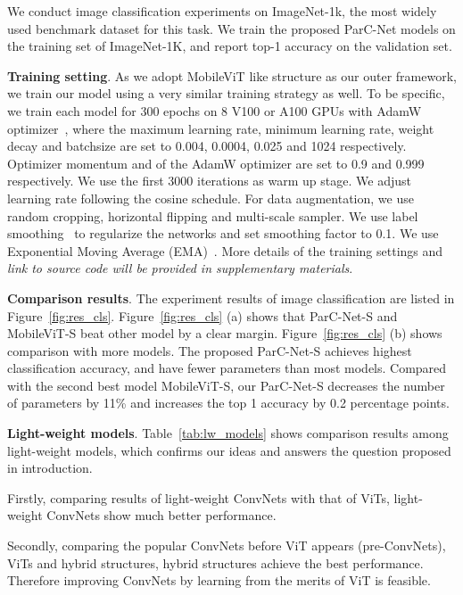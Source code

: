\documentclass[10pt,twocolumn,letterpaper]{article}
\begin{document}
We conduct image classification experiments on ImageNet-1k, the most widely used benchmark dataset for this task. We train the proposed ParC-Net models on the training set of ImageNet-1K, and report top-1 accuracy on the validation set.  

{\bf Training setting}. As we adopt MobileViT like structure as our outer framework, we train our model using a very similar training strategy as well. To be specific, we train each model for 300 epochs on 8 V100 or A100 GPUs with AdamW optimizer~\cite{loshchilov2019decoupled}, where the maximum learning rate, minimum learning rate, weight decay and batchsize are set to 0.004, 0.0004, 0.025 and 1024 respectively. Optimizer momentum  and  of the AdamW optimizer are set to 0.9 and 0.999 respectively. We use the first 3000 iterations as warm up stage. We adjust learning rate following the cosine schedule. For data augmentation, we use random cropping, horizontal flipping and multi-scale sampler. We use label smoothing~\cite{szegedy2016rethinking} to regularize the networks and set smoothing factor to 0.1. We use Exponential Moving Average (EMA)~\cite{polyak1992acceleration}. More details of the training settings and \emph{ link to source code will be provided in supplementary materials}. 

{\bf Comparison results}. The experiment results of image classification are listed in Figure~\ref{fig:res_cls}. Figure~\ref{fig:res_cls} (a) shows that ParC-Net-S and MobileViT-S beat other model by a clear margin. Figure~\ref{fig:res_cls} (b) shows comparison with more models. The proposed ParC-Net-S achieves highest classification accuracy, and have fewer parameters than most models. Compared with the second best model MobileViT-S, our ParC-Net-S decreases the number of parameters by 11\% and increases the top 1 accuracy by 0.2 percentage points. 



{\bf Light-weight models}. Table~\ref{tab:lw_models} shows comparison results among light-weight models, which confirms our ideas and answers the question proposed in introduction. 

Firstly, comparing results of light-weight ConvNets with that of ViTs, light-weight ConvNets show much better performance. 

Secondly, comparing the popular ConvNets before ViT appears (pre-ConvNets), ViTs and hybrid structures, hybrid structures achieve the best performance. Therefore improving ConvNets by learning from the merits of ViT is feasible. 
\end{document}
